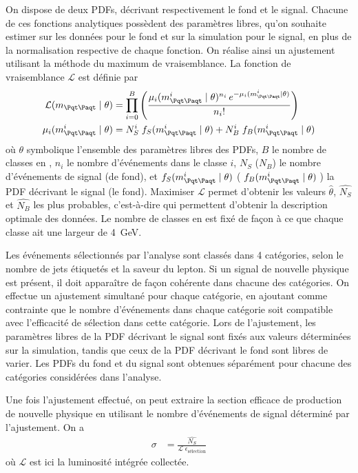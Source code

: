 On dispose de deux PDFs, décrivant respectivement le fond et le signal. Chacune de ces fonctions analytiques possèdent des paramètres libres, qu'on souhaite estimer sur les données pour le fond et sur la simulation pour le signal, en plus de la normalisation respective de chaque fonction. On réalise ainsi un ajustement utilisant la méthode du maximum de vraisemblance. La fonction de vraisemblance $\mathcal{L}$ est définie par
\begin{align*}
  \mathcal{L}(\mtt \mid \theta) &= \prod\limits_{i = 0}^B \left( \frac{\mu_i(\mtt^i \mid \theta)^{n_i} \, e^{- \mu_i(\mtt^i \mid \theta)}}{n_i!} \right) \\
  \mu_i(\mtt^i \mid \theta) &= N_S^i \; f_S(\mtt^i \mid \theta) + N_B^i \; f_B(\mtt^i \mid \theta)
\end{align*}
où $\theta$ symbolique l'ensemble des paramètres libres des PDFs, $B$ le nombre de classes en \mtt, $n_i$ le nombre d'événements dans le classe $i$, $N_S$ ($N_B$) le nombre d'événements de signal (de fond), et $f_S(\mtt^i \mid \theta)$ ($\;f_B(\mtt^i \mid \theta)\;$) la PDF décrivant le signal (le fond). Maximiser $\mathcal{L}$ permet d'obtenir les valeurs $\hat{\theta}$, $\hat{N_S}$ et $\hat{N_B}$ les plus probables, c'est-à-dire qui permettent d'obtenir la description optimale des données. Le nombre de classes en \mtt est fixé de façon à ce que chaque classe ait une largeur de \SI{4}{\GeV}.

\medskip

Les événements sélectionnés par l'analyse sont classés dans 4 catégories, selon le nombre de jets étiquetés \Pbottom et la saveur du lepton. Si un signal de nouvelle physique est présent, il doit apparaître de façon cohérente dans chacune des catégories. On effectue un ajustement simultané pour chaque catégorie, en ajoutant comme contrainte que le nombre d'événements dans chaque catégorie soit compatible avec l'efficacité de sélection dans cette catégorie. Lors de l’ajustement, les paramètres libres de la PDF décrivant le signal sont fixés aux valeurs déterminées sur la simulation, tandis que ceux de la PDF décrivant le fond sont libres de varier. Les PDFs du fond et du signal sont obtenues séparément pour chacune des catégories considérées dans l'analyse.

\bigskip

Une fois l'ajustement effectué, on peut extraire la section efficace de production de nouvelle physique en utilisant le nombre d'événements de signal déterminé par l'ajustement. On a
\begin{align} \label{eq:cross_section}
  \sigma &= \frac{\hat{N_S}}{\mathcal{L} \; \epsilon_{\text{sélection}}}
\end{align}
où $\mathcal{L}$ est ici la luminosité intégrée collectée.

